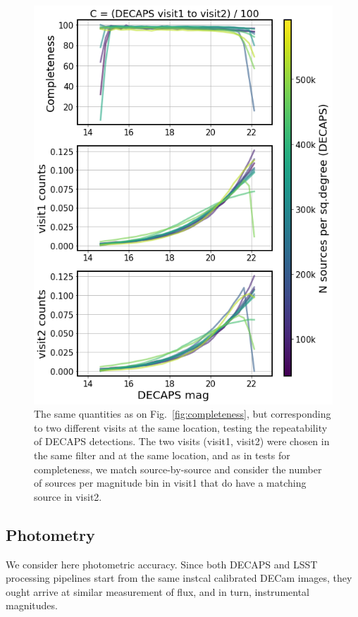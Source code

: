 \documentclass[DM,lsstdraft,toc,usenatbib]{lsstdoc}
\begin{document}
\begin{figure}
\begin{centering}
\includegraphics[width=0.75\columnwidth]{figs/completeness_3_decaps.png}
\caption{The same quantities as on Fig.~\ref{fig:completeness}, but corresponding to two different visits at the same location, testing the repeatability of DECAPS detections. The two visits (visit1, visit2) were chosen in the same filter and at the same location, and as in tests for completeness, we match source-by-source and consider the number of sources per magnitude bin in visit1 that do have a matching source in visit2. }
\label{fig:completeness_decaps}
\end{centering}
\end{figure} 







\subsection{Photometry}
\label{sec:photometry}

We consider here photometric accuracy. Since both DECAPS and LSST processing pipelines start from the same instcal calibrated DECam images, they ought arrive at similar measurement of flux, and in turn, instrumental magnitudes.  
\end{document}
